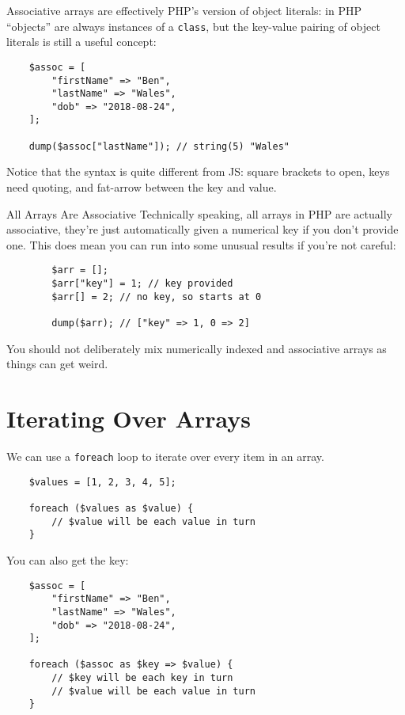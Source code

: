 Associative arrays are effectively PHP's version of object literals: in PHP ``objects'' are always instances of a \texttt{class}, but the key-value pairing of object literals is still a useful concept:

\begin{verbatim}
    $assoc = [
        "firstName" => "Ben",
        "lastName" => "Wales",
        "dob" => "2018-08-24",
    ];

    dump($assoc["lastName"]); // string(5) "Wales"
\end{verbatim}

Notice that the syntax is quite different from JS: square brackets to open, keys need quoting, and fat-arrow between the key and value.

\pagebreak

\begin{infobox}{All Arrays Are Associative}
    Technically speaking, all arrays in PHP are actually associative, they're just automatically given a numerical key if you don't provide one. This does mean you can run into some unusual results if you're not careful:

    \begin{verbatim}
        $arr = [];
        $arr["key"] = 1; // key provided
        $arr[] = 2; // no key, so starts at 0

        dump($arr); // ["key" => 1, 0 => 2]
    \end{verbatim}

    You should not deliberately mix numerically indexed and associative arrays as things can get weird.
\end{infobox}


\section{Iterating Over Arrays}

We can use a \texttt{foreach} loop to iterate over every item in an array.

\begin{verbatim}
    $values = [1, 2, 3, 4, 5];

    foreach ($values as $value) {
        // $value will be each value in turn
    }
\end{verbatim}

You can also get the key:

\begin{verbatim}
    $assoc = [
        "firstName" => "Ben",
        "lastName" => "Wales",
        "dob" => "2018-08-24",
    ];

    foreach ($assoc as $key => $value) {
        // $key will be each key in turn
        // $value will be each value in turn
    }
\end{verbatim}

